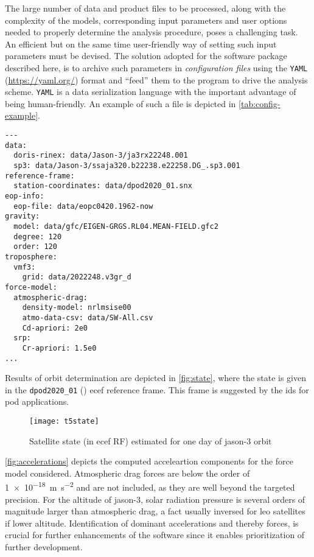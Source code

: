 The large number of data and product files to be processed, along with the complexity of 
the models, corresponding input parameters and user options needed to properly determine 
the analysis procedure, poses a challenging task. An efficient but on the same time 
user-friendly way of setting such input parameters must be devised. The solution adopted 
for the software package described here, is to archive such parameters in \emph{configuration files} 
using the \texttt{YAML} (\url{https://yaml.org/}) format and ``feed'' them to the 
program to drive the analysis scheme. \texttt{YAML} is a data serialization
language with the important advantage of being human-friendly. An example of such 
a file is depicted in \autoref{tab:config-example}.

\begin{adjustbox}{center, max width=\linewidth , fbox=0.5pt, captionbelow={Configuration file example.}, float=table}
\begin{BVerbatim}
---
data:
  doris-rinex: data/Jason-3/ja3rx22248.001
  sp3: data/Jason-3/ssaja320.b22238.e22258.DG_.sp3.001
reference-frame:
  station-coordinates: data/dpod2020_01.snx
eop-info:
  eop-file: data/eopc0420.1962-now
gravity:
  model: data/gfc/EIGEN-GRGS.RL04.MEAN-FIELD.gfc2
  degree: 120
  order: 120
troposphere:
  vmf3:
    grid: data/2022248.v3gr_d
force-model:
  atmospheric-drag:
    density-model: nrlmsise00
    atmo-data-csv: data/SW-All.csv
    Cd-apriori: 2e0
  srp:
    Cr-apriori: 1.5e0
...
\end{BVerbatim}
\label{tab:config-example}
\end{adjustbox}

Results of orbit determination are depicted in \autoref{fig:state}, where the state 
is given in the \texttt{dpod2020\_01} (\cite{Moreaux2023}) \gls{ecef} reference 
frame. This frame is suggested by the \gls{ids} for \gls{pod} applications.

\begin{figure}[h]
    \centering
    \texttt{[image: t5state]}
    \caption{Satellite state (in \gls{ecef} RF) estimated for one day of \gls{jason}-3 orbit}
    \label{fig:state}
\end{figure}

\autoref{fig:accelerations} depicts the computed acceleartion components for the 
force model considered. Atmospheric drag forces are below the order of \SI{1e-18}{\meter\per\second\squared} 
and are not included, as they are well beyond the targeted precision. For the altitude 
of \gls{jason}-3, solar radiation pressure is several orders of magnitude larger than 
atmospheric drag, a fact usually inversed for \gls{leo} satellites if lower 
altitude. Identification of dominant accelerations and thereby forces, is crucial 
for further enhancements of the software since it enables prioritization of further 
development.

